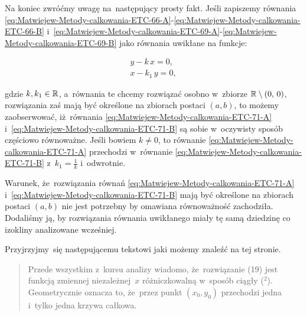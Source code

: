 \documentclass[a4paper,11pt]{article}
\numberwithin{equation}{section}
\begin{document}
Na koniec zwróćmy uwagę na~następujący prosty fakt. Jeśli zapiszemy równania
\eqref{eq:Matwiejew-Metody-calkowania-ETC-66-A}-\eqref{eq:Matwiejew-Metody-calkowania-ETC-66-B}
i~\eqref{eq:Matwiejew-Metody-calkowania-ETC-69-A}-\eqref{eq:Matwiejew-Metody-calkowania-ETC-69-B} jako równania uwikłane na funkcje:

\negVerSpaceFour


\begin{subequations}

  \begin{align}
    \label{eq:Uwagi-do-konkrentych-stron-52-A}
    y - k \, x = 0, \\
    \label{eq:Uwagi-do-konkrentych-stron-52-B}
    x - k_{ 1 } \, y = 0,
  \end{align}

\end{subequations}


\noindent
gdzie $k, k_{ 1 } \in \mathbb{R}$, a~równania te chcemy rozwiązać osobno w~zbiorze
$\mathbb{R} \setminus ( 0, \, 0 )$, rozwiązania zaś mają być określone na zbiorach postaci
$( a, b )$, to możemy zaobserwować, iż~równania
\eqref{eq:Matwiejew-Metody-calkowania-ETC-71-A}
i~\eqref{eq:Matwiejew-Metody-calkowania-ETC-71-B} są sobie w~oczywisty
sposób częściowo równoważne. Jeśli bowiem $k \neq 0$, to równanie
\eqref{eq:Matwiejew-Metody-calkowania-ETC-71-A} przechodzi w~równanie
\eqref{eq:Matwiejew-Metody-calkowania-ETC-71-B}
z~$k_{ 1 } = \frac{ 1 }{ k }$ i~odwrotnie.

Warunek, że~rozwiązania równań
\eqref{eq:Matwiejew-Metody-calkowania-ETC-71-A}
i~\eqref{eq:Matwiejew-Metody-calkowania-ETC-71-B} mają być określone na
zbiorach postaci $( a, b )$ nie jest potrzebny by omawiana równoważność
zachodziła. Dodaliśmy ją, by rozwiązania równania uwikłanego miały tę samą
dziedzinę co izokliny analizowane wcześniej.

\VerSpaceFour





\noindent
{} Przyjrzyjmy~się następującemu tekstowi jaki możemy znaleźć na tej
stronie.


\begin{quote}

  Przede wszystkim z~kursu analizy wiadomo, że~rozwiązanie (19) jest funkcją
  zmiennej niezależnej~$x$ różniczkowalną w~sposób ciągły (${}^{ 2 }$).
  Geometrycznie oznacza to, że~przez punkt $( x_{ 0 }, y_{ 0 } )$ przechodzi
  jedna i~tylko jedna krzywa całkowa.

\end{quote}
\end{document}
